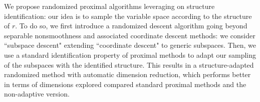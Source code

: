 


We propose randomized proximal algorithms leveraging on structure identification: our idea is to sample the variable space according to the structure of $r$. To do so, we first introduce a randomized descent algorithm going beyond separable nonsmoothness and associated coordinate descent methods:
we consider ``subspace descent" extending ``coordinate descent" to generic subspaces.
Then, we use a standard identification property of proximal methods to adapt our sampling of the subspaces with the identified structure. This results in a structure-adapted randomized method with automatic dimension reduction, which 
performs better in terms of dimensions explored compared standard proximal methods and the non-adaptive version.

